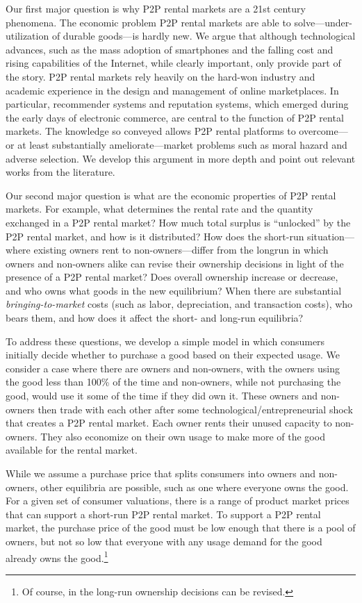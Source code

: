 \documentclass[11pt]{article}
\begin{document}
Our first major question is why P2P rental markets are a 21st century phenomena.
The economic problem P2P rental markets are able to solve---under-utilization of durable goods---is hardly new.  
We argue that although technological advances, such as the mass adoption of smartphones and the falling cost and rising capabilities of the Internet, while clearly important, only provide part of the story. 
P2P rental markets rely heavily on the hard-won industry and academic experience in the design and management of online marketplaces.
In particular, recommender systems and reputation systems, which emerged during the early days of electronic commerce, are central to the function of P2P rental markets. 
The knowledge so conveyed allows P2P rental platforms to overcome---or at least substantially ameliorate---market problems such as moral hazard and adverse selection.  
We develop this argument in more depth and point out relevant works from the literature. 

Our second major question is what are the economic properties of P2P rental markets. 
For example, what determines the rental rate and the quantity exchanged in a P2P rental market? 
How much total surplus is ``unlocked'' by the P2P rental market, and how is it distributed? 
How does the short-run situation---where existing owners rent to non-owners---differ from the longrun in which owners and non-owners alike can revise their ownership decisions in light of the presence of a P2P rental market?
Does overall ownership increase or decrease, and who owns what goods in the new equilibrium?
When there are substantial \emph{bringing-to-market} costs (such as labor, depreciation, and transaction costs), who bears them, and how does it affect the short- and long-run equilibria? 

To address these questions, we develop a simple model in which consumers initially decide whether to purchase a good based on their expected usage.
We consider a case where there are owners and non-owners, with the owners using the good less than 100\% of the time and non-owners, while not purchasing the good, would use it some of the time if they did own it. 
These owners and non-owners then trade with each other after some technological/entrepreneurial shock that creates a P2P rental market.
Each owner rents their unused capacity to non-owners.
They also economize on their own usage to make more of the good available for the rental market.

While we assume a purchase price that splits consumers into owners and non-owners, other equilibria are possible, such as one where everyone owns the good.
For a given set of consumer valuations, there is a range of product market prices that can support a short-run P2P rental market.
To support a P2P rental market, the purchase price of the good must be low enough that there is a pool of owners, but not so low that everyone with any usage demand for the good already owns the good.\footnote{
  Of course, in the long-run ownership decisions can be revised.
}   
\end{document}
